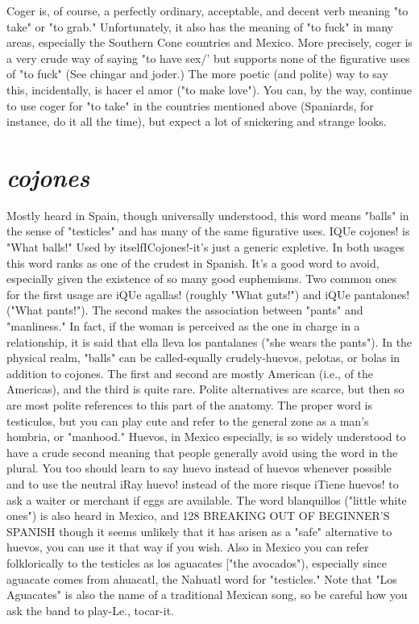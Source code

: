 Coger is, of course, a perfectly ordinary, acceptable, and decent
verb meaning "to take" or "to grab." Unfortunately, it also has the
meaning of "to fuck" in many areas, especially the Southern Cone
countries and Mexico. More precisely, coger is a very crude way of saying "to have sex/' but supports none of the figurative uses of "to fuck"
(See chingar and joder.) The more poetic (and polite) way to say this,
incidentally, is hacer el amor ("to make love"). You can, by the way,
continue to use coger for "to take" in the countries mentioned above
(Spaniards, for instance, do it all the time), but expect a lot of snickering and strange looks.

\section{\emph{cojones}}

Mostly heard in Spain, though universally understood, this
word means "balls" in the sense of "testicles" and has many of the
same figurative uses. IQUe cojones! is "What balls!" Used by itselfICojones!-it's just a generic expletive. In both usages this word ranks
as one of the crudest in Spanish. It's a good word to avoid, especially
given the existence of so many good euphemisms. Two common ones
for the first usage are iQUe agallas! (roughly "What guts!") and iQUe
pantalones! ("What pants!"). The second makes the association between "pants" and "manliness." In fact, if the woman is perceived as
the one in charge in a relationship, it is said that ella lleva los pantalanes ("she wears the pants").
In the physical realm, "balls" can be called-equally
crudely-huevos, pelotas, or bolas in addition to cojones. The first
and second are mostly American (i.e., of the Americas), and the third is
quite rare. Polite alternatives are scarce, but then so are most polite
references to this part of the anatomy. The proper word is testiculos,
but you can play cute and refer to the general zone as a man's hombria,
or "manhood."
Huevos, in Mexico especially, is so widely understood to have
a crude second meaning that people generally avoid using the word in
the plural. You too should learn to say huevo instead of huevos whenever possible and to use the neutral iRay huevo! instead of the more
risque iTiene huevos! to ask a waiter or merchant if eggs are available.
The word blanquillos ("little white ones") is also heard in Mexico, and
128 BREAKING OUT OF BEGINNER'S SPANISH
though it seems unlikely that it has arisen as a "safe" alternative to
huevos, you can use it that way if you wish. Also in Mexico you can
refer folklorically to the testicles as los aguacates ["the avocados"),
especially since aguacate comes from ahuacatl, the Nahuatl word
for "testicles." Note that "Los Aguacates" is also the name of a traditional Mexican song, so be careful how you ask the band to play-Le.,
tocar-it.

